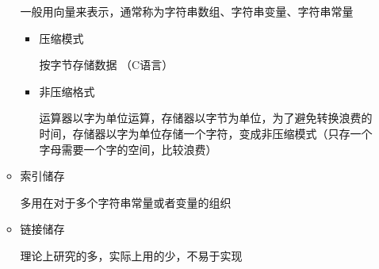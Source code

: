 \documentclass[AutoFakeBold]{LZUThesis2007}
\begin{document}
\begin{itemize}
\begin{itemize}
				一般用向量来表示，通常称为字符串数组、字符串变量、字符串常量
					\begin{itemize}
						\item 压缩模式

						按字节存储数据 （C语言）

						\item 非压缩格式

						运算器以字为单位运算，存储器以字节为单位，为了避免转换浪费的时间，存储器以字为单位存储一个字符，变成非压缩模式（只存一个字母需要一个字的空间，比较浪费）
					\end{itemize}
				\item 索引储存

				多用在对于多个字符串常量或者变量的组织
				\item 链接储存

				理论上研究的多，实际上用的少，不易于实现
			\end{itemize}
	\end{itemize}
\end{document}
